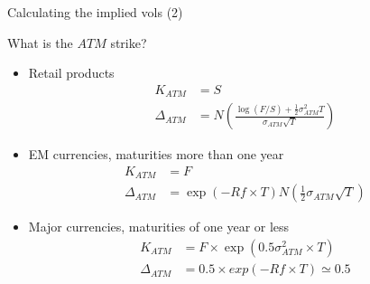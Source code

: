 \begin{frame}[fragile]{Calculating the implied vols (2)}

\begin{Shaded}
\begin{Highlighting}[]

\OperatorTok{$}\StringTok{ }\OperatorTok{+}\StringTok{ }\OperatorTok{+}\StringTok{ }\OperatorTok{*}
\OperatorTok{$}\StringTok{ }\OperatorTok{+}\StringTok{ }\OperatorTok{+}\StringTok{ }\OperatorTok{*}
\OperatorTok{$}\StringTok{ }\OperatorTok{$}\OperatorTok{-}\StringTok{ }
\OperatorTok{$}\StringTok{ }\OperatorTok{$}\OperatorTok{-}\StringTok{ }
\OperatorTok{$}\StringTok{ }

\StringTok{ }\OperatorTok{/}   
\end{Highlighting}
\end{Shaded}

\end{frame}

\begin{frame}{What is the \(ATM\) strike?}

\begin{itemize}
\tightlist
\item
  Retail products \[
  \begin{aligned}
  K_{ATM} &= S\\
  \Delta_{ATM} &= N \left(\frac{\log(F/S) + \frac{1}{2} \sigma_{ATM}^2 T}{\sigma_{ATM} \sqrt T} \right)
  \end{aligned}
  \]
\item
  EM currencies, maturities more than one year \[
  \begin{aligned}
  K_{ATM} &= F\\
  \Delta_{ATM} &= \exp(-Rf \times T)N(\frac{1}{2}\sigma_{ATM} \sqrt T) 
  \end{aligned}
  \]
\item
  Major currencies, maturities of one year or less \[
  \begin{aligned}
   K_{ATM} &= F \times \exp\left( 0.5 \sigma^2_{ATM}\times T \right)\\
   \Delta_{ATM} &= 0.5\times exp(-Rf \times T) \simeq 0.5 
  \end{aligned}
  \]
\end{itemize}

\end{frame}

